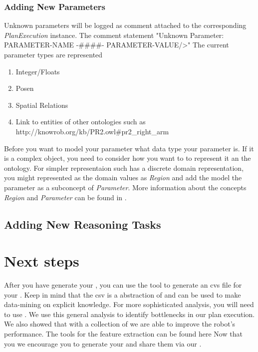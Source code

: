 \subsubsection{Adding New Parameters}
Unknown parameters will be logged as comment attached to the corresponding \textit{PlanExecution} instance.
The comment statement "Unknown Parameter: PARAMETER-NAME  -\#\#\#\#- PARAMETER-VALUE/>"
The current parameter types are represented 


\begin{enumerate} 
	\item Integer/Floats
	\item Posen
	\item Spatial Relations
	\item Link to entities of other ontologies such as http://knowrob.org/kb/PR2.owl\#pr2\_right\_arm
\end{enumerate}

Before you want to model your parameter what data type your parameter is.
If it is a complex object, you need to consider how you want to to represent it an the ontology.
For simpler representaion such has a discrete domain representation, you might represented as the domain values as \textit{Region} and add the model the parameter as a subconcept of \textit{Parameter}.
More information about the concepts \textit{Region} and \textit{Parameter} can be found in .


\subsection{Adding New Reasoning Tasks}



\section{Next steps}
After you have generate your \neem, you can use the tool  to generate an cvs file for your \neem.
Keep in mind that the csv is a abstraction of \neemnar and can be used to make data-mining on explicit knowledge.
For more sophisticated analysis, you will need to use \knowrob. 
We use this general analysis to identify bottlenecks in our plan execution.
We also showed that with a collection of \neems we are able to improve the robot's performance.
The tools for the feature extraction can be found here 
Now that you we encourage you to generate your \neems and share them via our \neemhub.


